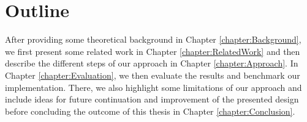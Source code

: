 \section{Outline}
After providing some theoretical background in Chapter \ref{chapter:Background}, we first present some related work in Chapter \ref{chapter:RelatedWork} and then describe the different steps of our approach in Chapter \ref{chapter:Approach}.
In Chapter \ref{chapter:Evaluation}, we then evaluate the results and benchmark our implementation. There, we also highlight some limitations of our approach and include ideas for future continuation and improvement of the presented design before concluding the outcome of this thesis in Chapter \ref{chapter:Conclusion}.
